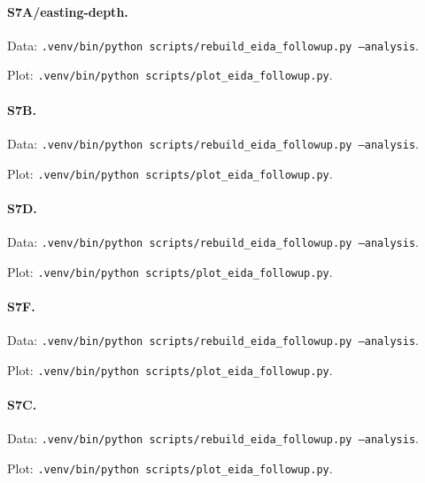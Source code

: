 \paragraph{S7A/easting-depth.}
\par Data: \texttt{.venv/bin/python scripts/rebuild\_eida\_followup.py --analysis}.
\par Plot: \texttt{.venv/bin/python scripts/plot\_eida\_followup.py}.
\par{}
\paragraph{S7B.}
\par Data: \texttt{.venv/bin/python scripts/rebuild\_eida\_followup.py --analysis}.
\par Plot: \texttt{.venv/bin/python scripts/plot\_eida\_followup.py}.
\par{}
\paragraph{S7D.}
\par Data: \texttt{.venv/bin/python scripts/rebuild\_eida\_followup.py --analysis}.
\par Plot: \texttt{.venv/bin/python scripts/plot\_eida\_followup.py}.
\par{}
\paragraph{S7F.}
\par Data: \texttt{.venv/bin/python scripts/rebuild\_eida\_followup.py --analysis}.
\par Plot: \texttt{.venv/bin/python scripts/plot\_eida\_followup.py}.
\par{}
\paragraph{S7C.}
\par Data: \texttt{.venv/bin/python scripts/rebuild\_eida\_followup.py --analysis}.
\par Plot: \texttt{.venv/bin/python scripts/plot\_eida\_followup.py}.
\par{}
